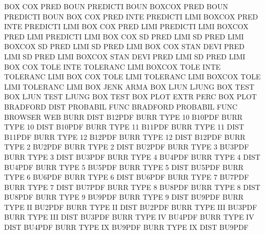 BOX      COX  PRED BOUN                 PREDICTI BOUN
BOXCOX   PRED BOUN                      PREDICTI BOUN
BOX      COX  PRED INTE                 PREDICTI LIMI
BOXCOX   PRED INTE                      PREDICTI LIMI
BOX      COX  PRED LIMI                 PREDICTI LIMI
BOXCOX   PRED LIMI                      PREDICTI LIMI
BOX      COX  SD   PRED LIMI            SD       PRED LIMI
BOXCOX   SD   PRED LIMI                 SD       PRED LIMI
BOX      COX  STAN DEVI PRED LIMI       SD       PRED LIMI
BOXCOX   STAN DEVI PRED LIMI            SD       PRED LIMI
BOX      COX  TOLE INTE                 TOLERANC LIMI
BOXCOX   TOLE INTE                      TOLERANC LIMI
BOX      COX  TOLE LIMI                 TOLERANC LIMI
BOXCOX   TOLE LIMI                      TOLERANC LIMI
BOX      JENK                           ARMA
BOX      LJUN                           LJUNG    BOX  TEST
BOX      LJUN TEST                      LJUNG    BOX  TEST
BOX      PLOT EXTR PERC                 BOX      PLOT
BRADFORD DIST                           PROBABIL FUNC
BRADFORD                                PROBABIL FUNC
BROWSER                                 WEB
BURR     DIST                           B12PDF
BURR     TYPE 10                        B10PDF
BURR     TYPE 10   DIST                 B10PDF
BURR     TYPE 11                        B11PDF
BURR     TYPE 11   DIST                 B11PDF
BURR     TYPE 12                        B12PDF
BURR     TYPE 12   DIST                 B12PDF
BURR     TYPE 2                         BU2PDF
BURR     TYPE 2    DIST                 BU2PDF
BURR     TYPE 3                         BU3PDF
BURR     TYPE 3    DIST                 BU3PDF
BURR     TYPE 4                         BU4PDF
BURR     TYPE 4    DIST                 BU4PDF
BURR     TYPE 5                         BU5PDF
BURR     TYPE 5    DIST                 BU5PDF
BURR     TYPE 6                         BU6PDF
BURR     TYPE 6    DIST                 BU6PDF
BURR     TYPE 7                         BU7PDF
BURR     TYPE 7    DIST                 BU7PDF
BURR     TYPE 8                         BU8PDF
BURR     TYPE 8    DIST                 BU8PDF
BURR     TYPE 9                         BU9PDF
BURR     TYPE 9    DIST                 BU9PDF
BURR     TYPE II                        BU2PDF
BURR     TYPE II   DIST                 BU2PDF
BURR     TYPE III                       BU3PDF
BURR     TYPE III  DIST                 BU3PDF
BURR     TYPE IV                        BU4PDF
BURR     TYPE IV   DIST                 BU4PDF
BURR     TYPE IX                        BU9PDF
BURR     TYPE IX   DIST                 BU9PDF
